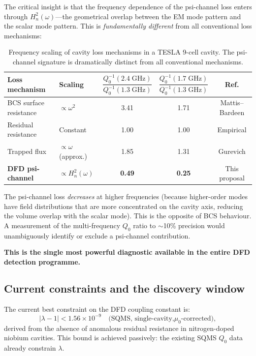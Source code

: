 \documentclass[11pt]{article}
\newcommand{\lbone}{|\lambda - 1|}
\newcommand{\ee}[1]{\times 10^{#1}}
\newcommand{\Heff}{H_n}
\begin{document}
The critical insight is that the frequency dependence of the psi-channel
loss enters through $\Heff^2(\omega)$---the geometrical overlap between
the EM mode pattern and the scalar mode pattern. This is
\textit{fundamentally different} from all conventional loss mechanisms:

\begin{table}[H]
\centering
\caption{Frequency scaling of cavity loss mechanisms in a TESLA 9-cell
cavity. The psi-channel signature is dramatically distinct from all
conventional mechanisms.}
\label{tab:freq_scaling}
\renewcommand{\arraystretch}{1.3}
\begin{tabular}{@{}llccc@{}}
\toprule
\textbf{Loss mechanism} & \textbf{Scaling} &
  $\dfrac{Q_0^{-1}(2.4\;\text{GHz})}{Q_0^{-1}(1.3\;\text{GHz})}$ &
  $\dfrac{Q_0^{-1}(1.7\;\text{GHz})}{Q_0^{-1}(1.3\;\text{GHz})}$ &
  \textbf{Ref.} \\
\midrule
BCS surface resistance & $\propto \omega^2$ & 3.41 & 1.71 & Mattis--Bardeen \\
Residual resistance & Constant & 1.00 & 1.00 & Empirical \\
Trapped flux & $\propto \omega$ (approx.) & 1.85 & 1.31 & Gurevich \\
\rowcolor{yellow!20}
\textbf{DFD psi-channel} & $\propto \Heff^2(\omega)$ & \textbf{0.49} & \textbf{0.25} & This proposal \\
\bottomrule
\end{tabular}
\end{table}

\noindent The psi-channel loss \textit{decreases} at higher frequencies
(because higher-order modes have field distributions that are more
concentrated on the cavity axis, reducing the volume overlap with the
scalar mode). This is the opposite of BCS behaviour. A measurement of
the multi-frequency $Q_0$ ratio to $\sim$10\% precision would
unambiguously identify or exclude a psi-channel contribution.

\textbf{This is the single most powerful diagnostic available in the
entire DFD detection programme.}

\subsection{Current constraints and the discovery window}

The current best constraint on the DFD coupling constant is:
\begin{equation}
\lbone < 1.56\ee{-9} \quad\text{(SQMS, single-cavity,
$\mu_0$-corrected)},
\end{equation}
derived from the absence of anomalous residual resistance in
nitrogen-doped niobium cavities. This bound is achieved passively: the
existing SQMS $Q_0$ data already constrain $\lambda$.
\end{document}
